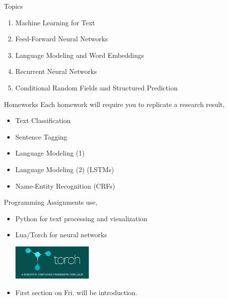 \documentclass{beamer}
\begin{document}
\begin{frame}{Topics}

  \begin{enumerate}
  \item Machine Learning for Text
    \pause
    \air
  \item Feed-Forward Neural Networks
    \pause
    \air 
  \item Language Modeling and Word Embeddings 
    \pause
    \air
  \item Recurrent Neural Networks
    \pause
    \air
  \item Conditional Random Fields and Structured Prediction
  \end{enumerate}
\end{frame}

\begin{frame}{Homeworks}
  Each homework will require you to replicate a research result,

  \begin{itemize}
  \item Text Classification
  \item Sentence Tagging
  \item Language Modeling (1)
  \item Language Modeling (2) (LSTMs)
  \item Name-Entity Recognition (CRFs)
  \end{itemize}

\end{frame}

\begin{frame}{Programming}
  Assignments use,
  \begin{itemize}
  \item Python for text processing and visualization
  \item Lua/Torch for neural networks

  \begin{center}
    \includegraphics[width=4cm]{torch}
  \end{center}

   \item First section on Fri. will be introduction.
  \end{itemize}
\end{frame}
\end{document}
